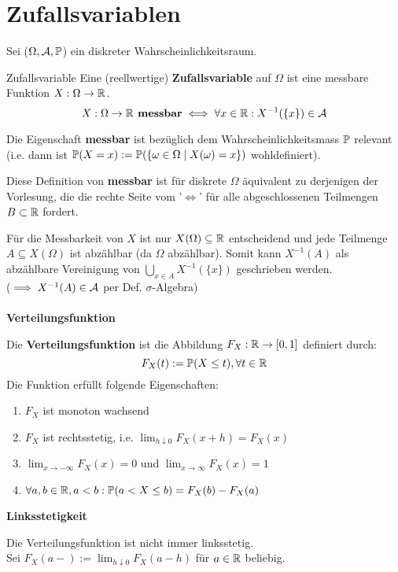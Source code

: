 \section{Zufallsvariablen}
Sei ($\Omega, \A, \P$) ein diskreter Wahrscheinlichkeitsraum.
\begin{mainbox}{Zufallsvariable}
    Eine (reellwertige) \textbf{Zufallsvariable} auf $\Omega$ ist eine messbare Funktion $X: \Omega \to \R$.
    $$X: \Omega \to \R \textbf{ messbar} \iff \forall x \in \R: X^{-1}(\{x\}) \in \A$$
 
    Die Eigenschaft \textbf{messbar} ist bezüglich dem Wahrscheinlichkeitsmass $\P$ relevant (i.e. dann ist $\P(X = x) := \P(\{\omega \in \Omega \mid X(\omega) = x\})$ wohldefiniert).
\end{mainbox}
Diese Definition von \textbf{messbar} ist für diskrete $\Omega$ äquivalent zu derjenigen der Vorlesung, die die rechte Seite vom '$\iff$' für alle abgeschlossenen Teilmengen $B \subset \R$ fordert. 

Für die Messbarkeit von $X$ ist nur $X(\Omega) \subseteq \R$ entscheidend und jede Teilmenge $A \subseteq X(\Omega)$ ist abzählbar (da $\Omega$ abzählbar). Somit kann $X^{-1}(A)$ als abzählbare Vereinigung von $\bigcup_{x \in A} X^{-1}(\{x\})$ geschrieben werden. 
\\($\implies X^{-1}(A) \in \A$ per Def. $\sigma$-Algebra)
\\ \\ \textbf{Verteilungsfunktion}

Die \textbf{Verteilungsfunktion} ist die Abbildung $F_X : \R \to [0,1]$ definiert durch:
$$F_X(t) := \P(X \leq t), \forall t \in \R$$
\vfill\break
Die Funktion erfüllt folgende Eigenschaften:
\begin{enumerate}
    \item $F_X$ ist monoton wachsend 
    \item $F_X$ ist rechtsstetig, i.e. $\lim_{h \downarrow 0}F_X(x+h) = F_X(x)$
    \item $\lim_{x \to -\infty}F_X(x) = 0$ und $\lim_{x \to \infty}F_X(x) = 1$
    \item $\forall a,b \in \R, a < b: \P(a < X \leq b) = F_X(b) -F_X(a)$ 
\end{enumerate}

\textbf{Linksstetigkeit}

Die Verteilungsfunktion ist nicht immer linksstetig.
\\Sei $F_X(a-) := \lim_{h \downarrow 0}F_X(a-h)$ für $a \in \R$ beliebig.


